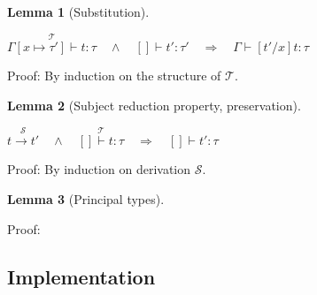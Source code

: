 \documentclass[a4paper]{article}
\newcommand{\im}{\Rightarrow}
\newcommand{\step}{\to}
\newcommand{\T}{\mathcal{T}}
\renewcommand{\S}{\mathcal{S}}
\newcommand{\stackover}[2]{\stackrel{{#2}}{#1}}
\newtheorem{lemma}{Lemma}[section]
\begin{document}
\begin{lemma}[Substitution] $ $
  \label{lemma:substitution}

$\stackover{\Gamma[x \mapsto \tau'] \vdash t: \tau}{\T} \quad \land \quad []\vdash t':\tau' \quad \im \quad
\Gamma \vdash [t'/x]t : \tau$
\end{lemma}

Proof: By induction on the structure of $\T$.


\begin{lemma}[Subject reduction property, preservation] $ $
  \label{lemma:preservation}

$\stackover{t \step t'}{\S} \quad \land \quad \stackover{[] \vdash t: \tau}{\T} \quad \im \quad [] \vdash t' : \tau$
\end{lemma}

Proof: By induction on derivation $\S$.


\begin{lemma}[Principal types] $ $
  \label{lemma:principalTypes}

\end{lemma}

Proof:


\newpage
\begin{appendices}


\section{Implementation}
\label{appendix:implementation}



\end{appendices}

\newpage


\end{document}
